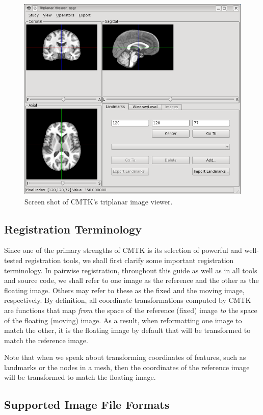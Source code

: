 \documentclass{InsightArticle}
\begin{document}
\begin{figure}[tbp]
\centerline{\includegraphics[width=.7\linewidth]{img/triplanar}}
\caption{Screen shot of CMTK's triplanar image viewer.}
\label{fig:triplanar}
\end{figure}

\subsection{Registration Terminology}

Since one of the primary strengths of CMTK is its selection of powerful and
well-tested registration tools, we shall first clarify some important
registration terminology.  In pairwise
registration,  throughout this guide as well as
in all tools and source code, we shall refer to one image as the reference
 and the other as the floating
image.  Others may refer to these as the fixed
 and the moving image, 
respectively. By definition, all coordinate transformations computed by CMTK
are functions that map {\em from\/} the space of the reference (fixed) image
{\em to\/} the space of the floating (moving) image. As a result, when
reformatting one image to match the other, it is the floating image by default
that will be transformed to match the reference image.

Note that when we speak about transforming coordinates of features, such as
landmarks or the nodes in a mesh, then the coordinates of the reference image
will be transformed to match the floating image.

\subsection{Supported Image File Formats}
\end{document}
